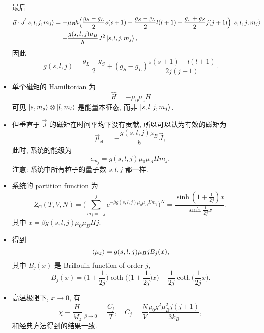 \begin{itemize}
\begin{tcolorbox}[title=calculation:]
		最后
		\begin{align}
			\vec{\mu} \cdot \vec{J} \ket{s, l, j, m_j} &= - \mu_B \hbar \Big( \frac{g_S - g_L}{2} s (s + 1) - \frac{g_S - g_L}{2} l (l + 1) + \frac{g_L + g_S}{2} j (j + 1) \Big) \ket{s, l, j, m_j} \notag \\
			&= - \frac{g(s, l, j) \mu_B}{\hbar} J^2 \ket{s, l, j, m_j},
		\end{align}
		因此
		\begin{equation}
			g(s, l, j) = \frac{g_L + g_S}{2} + (g_S - g_L) \frac{s (s + 1) - l (l + 1)}{2 j (j + 1)}.
		\end{equation}
	\end{tcolorbox}
	
	\item 单个磁矩的 Hamiltonian 为
	\begin{equation}
		\hat{H} = - \mu_0 \mu_z H
	\end{equation}
	可见 $\ket{s, m_s} \otimes \ket{l, m_l}$ 是能量本征态, 而非 $\ket{s, l, j, m_j}$. 
	
	\item 但垂直于 $\vec{J}$ 的磁矩在时间平均下没有贡献, 所以可以认为有效的磁矩为
	\begin{equation}
		\vec{\mu}_\text{eff} = - \frac{g(s, l, j) \mu_B}{\hbar} \vec{J},
	\end{equation}
	此时, 系统的能级为
	\begin{equation}
		\epsilon_{m_j} = g(s, l, j) \mu_0 \mu_B H m_j,
	\end{equation}
	注意: 系统中所有粒子的量子数 $s, l, j$ 都一样.
	
	\item 系统的 partition function 为
	\begin{equation}
		Z_\text{C}(T, V, N) = \Big( \sum_{m_j = - j}^j e^{- \beta g(s, l, j) \mu_0 \mu_B H m_j} \Big)^N = \frac{\sinh (1 + \frac{1}{2 j}) x}{\sinh \frac{1}{2 j} x},
	\end{equation}
	其中 $x = \beta g(s, l, j) \mu_0 \mu_B H j$.
	
	\item 得到
	\begin{equation}
		\braket{\mu_z} = g(s, l, j) \mu_B j B_j(x),
	\end{equation}
	其中 $B_j(x)$ 是 Brillouin function of order $j$,
	\begin{equation}
		B_j(x) = \Big( 1 + \frac{1}{2 j} \Big) \coth \Big( \Big( 1 + \frac{1}{2 j} \Big) x \Big) - \frac{1}{2 j} \coth \Big( \frac{1}{2 j} x \Big).
	\end{equation}
	
	\item 高温极限下, $x \rightarrow 0$, 有
	\begin{equation}
		\chi \equiv \frac{H}{M_z} \Big|_{\beta \rightarrow 0} = \frac{C_j}{T}, \quad C_j = \frac{N}{V} \frac{\mu_0 g^2 \mu_B^2 j (j + 1)}{3 k_B},
	\end{equation}
	和经典方法得到的结果一致.
\end{itemize}

